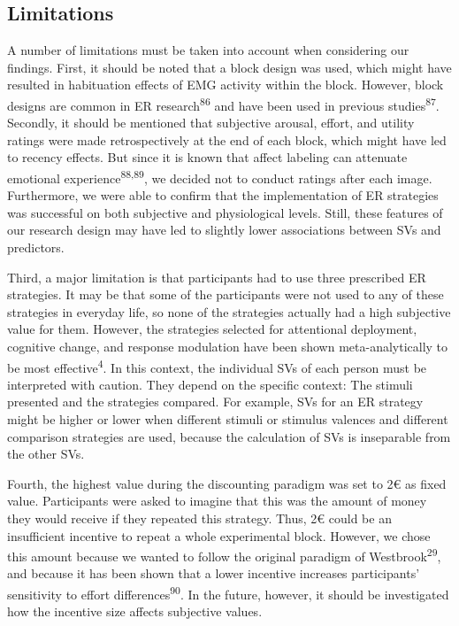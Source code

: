 \documentclass[
  man,floatsintext]{apa6}
\begin{document}
\hypertarget{limitations}{%
\subsection{Limitations}\label{limitations}}

A number of limitations must be taken into account when considering our findings.
First, it should be noted that a block design was used, which might have resulted in habituation effects of EMG activity within the block.
However, block designs are common in ER research\textsuperscript{86} and have been used in previous studies\textsuperscript{87}.
Secondly, it should be mentioned that subjective arousal, effort, and utility ratings were made retrospectively at the end of each block, which might have led to recency effects.
But since it is known that affect labeling can attenuate emotional experience\textsuperscript{88,89}, we decided not to conduct ratings after each image.
Furthermore, we were able to confirm that the implementation of ER strategies was successful on both subjective and physiological levels.
Still, these features of our research design may have led to slightly lower associations between SVs and predictors.

Third, a major limitation is that participants had to use three prescribed ER strategies.
It may be that some of the participants were not used to any of these strategies in everyday life, so none of the strategies actually had a high subjective value for them.
However, the strategies selected for attentional deployment, cognitive change, and response modulation have been shown meta-analytically to be most effective\textsuperscript{4}.
In this context, the individual SVs of each person must be interpreted with caution.
They depend on the specific context: The stimuli presented and the strategies compared.
For example, SVs for an ER strategy might be higher or lower when different stimuli or stimulus valences and different comparison strategies are used, because the calculation of SVs is inseparable from the other SVs.

Fourth, the highest value during the discounting paradigm was set to 2€ as fixed value.
Participants were asked to imagine that this was the amount of money they would receive if they repeated this strategy.
Thus, 2€ could be an insufficient incentive to repeat a whole experimental block.
However, we chose this amount because we wanted to follow the original paradigm of Westbrook\textsuperscript{29}, and because it has been shown that a lower incentive increases participants' sensitivity to effort differences\textsuperscript{90}.
In the future, however, it should be investigated how the incentive size affects subjective values.
\end{document}
